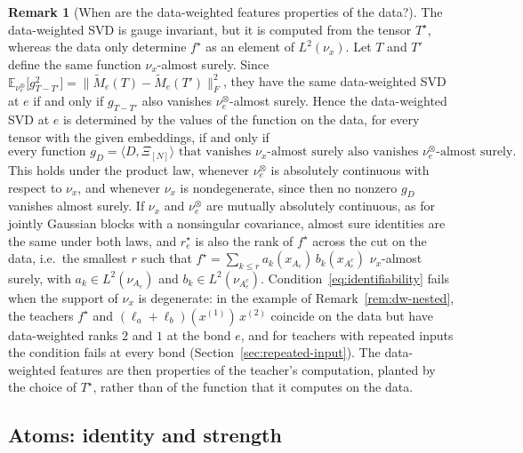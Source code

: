 \documentclass[11pt]{article}
\newcommand{\E}{\mathbb{E}}
\newcommand{\norm}[1]{\lVert #1\rVert}
\theoremstyle{definition}
\newtheorem{remark}[theorem]{Remark}
\numberwithin{equation}{section}
\begin{document}
\begin{remark}[When are the data-weighted features properties of the data?]\label{rem:joint-identifiability}
The data-weighted SVD is gauge invariant, but it is computed from the tensor $T^\star$, whereas the data only determine $f^\star$ as an element of $L^2(\nu_x)$. Let $T$ and $T'$ define the same function $\nu_x$-almost surely. Since $\E_{\nu^\otimes_e}\big[g_{T-T'}^2\big]=\norm{\tilde M_e(T)-\tilde M_e(T')}_F^2$, they have the same data-weighted SVD at $e$ if and only if $g_{T-T'}$ also vanishes $\nu^\otimes_e$-almost surely. Hence the data-weighted SVD at $e$ is determined by the values of the function on the data, for every tensor with the given embeddings, if and only if
\begin{equation}\label{eq:identifiability}
\text{every function }g_D=\langle D,\Xi_{[N]}\rangle\text{ that vanishes }\nu_x\text{-almost surely also vanishes }\nu^\otimes_e\text{-almost surely.}
\end{equation}
This holds under the product law, whenever $\nu^\otimes_e$ is absolutely continuous with respect to $\nu_x$, and whenever $\nu_x$ is nondegenerate, since then no nonzero $g_D$ vanishes almost surely. If $\nu_x$ and $\nu^\otimes_e$ are mutually absolutely continuous, as for jointly Gaussian blocks with a nonsingular covariance, almost sure identities are the same under both laws, and $r^\star_e$ is also the rank of $f^\star$ across the cut on the data, i.e.\ the smallest $r$ such that $f^\star=\sum_{k\le r}a_k(x_{A_e})\,b_k(x_{A_e^c})$ $\nu_x$-almost surely, with $a_k\in L^2(\nu_{A_e})$ and $b_k\in L^2(\nu_{A_e^c})$. Condition~\eqref{eq:identifiability} fails when the support of $\nu_x$ is degenerate: in the example of Remark~\ref{rem:dw-nested}, the teachers $f^\star$ and $(\ell_a+\ell_b)(x^{(1)})\,x^{(2)}$ coincide on the data but have data-weighted ranks $2$ and $1$ at the bond $e$, and for teachers with repeated inputs the condition fails at every bond (Section~\ref{sec:repeated-input}). The data-weighted features are then properties of the teacher's computation, planted by the choice of $T^\star$, rather than of the function that it computes on the data.
\end{remark}

\subsection{Atoms: identity and strength}\label{sec:atoms}
\end{document}
